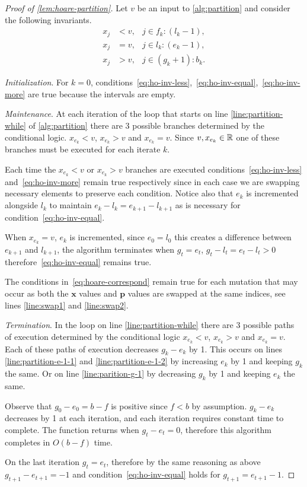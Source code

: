 \documentclass[10pt]{article} %
\begin{document}
\begin{proof}[Proof of \cref{lem:hoare-partition}]
Let $v$ be an input to \cref{alg:partition} and consider the following invariants.
\begin{align}
\label{eq:ho-inv-less}   x_j &< v, & j\in f_k{:}(l_k-1), \\
\label{eq:ho-inv-equal}  x_j &= v, & j \in l_k{:}(e_k-1), \\
\label{eq:ho-inv-more}   x_j &> v, & j \in (g_k+1){:}b_k.
\end{align}
  
\emph{Initialization}. For $k=0$, conditions~\eqref{eq:ho-inv-less},~\eqref{eq:ho-inv-equal},~\eqref{eq:ho-inv-more} are true because the intervals are empty. 
  
\emph{Maintenance}. At each iteration of the loop that starts on line \ref{line:partition-while} of \cref{alg:partition} there are 3 possible branches determined by the conditional logic. $x_{e_k} < v$, $x_{e_k} > v$ and $x_{e_k} = v$. Since $v, x_{e_k} \in \mathbb{R}$ one of these branches must be executed for each iterate $k$.

Each time the $x_{e_k} < v$ or $x_{e_k} > v$ branches are executed conditions~\eqref{eq:ho-inv-less} and~\eqref{eq:ho-inv-more} remain true respectively since in each case we are swapping necessary elements to preserve each condition. Notice also that $e_k$ is incremented alongside $l_k$ to maintain $e_k - l_k = e_{k+1} - l_{k+1}$ as is necessary for condition~\eqref{eq:ho-inv-equal}.

When $x_{e_k} = v$, $e_k$ is incremented, since $e_0 = l_0$ this creates a difference between $e_{k+1}$ and $l_{k+1}$, the algorithm terminates when $g_t = e_t$, $g_t - l_t = e_t - l_t > 0$ therefore~\eqref{eq:ho-inv-equal} remains true.   

The conditions in~\eqref{eq:hoare-correspond} remain true for each mutation that may occur as both the $\bm{x}$ values and $\bm{p}$ values are swapped at the same indices, see lines \ref{line:swap1} and \ref{line:swap2}.
  
\emph{Termination}. In the loop on line \ref{line:partition-while} there are 3 possible paths of execution determined by the conditional logic $x_{e_k} < v$, $x_{e_k} > v$ and $x_{e_k} = v$. Each of these paths of execution decreases $g_k - e_k$ by 1. This occurs on lines \ref{line:partition-e-1-1} and \ref{line:partition-e-1-2} by increasing $e_k$ by 1 and keeping $g_k$ the same. Or on line \ref{line:parition-g-1} by decreasing $g_k$ by 1 and keeping $e_k$ the same.
  
Observe that  $g_0 - e_0 = b - f$ is positive since $f<b$ by assumption. $g_k-e_k$ decreases by 1 at each iteration, and each iteration requires constant time to complete. The function returns when $g_t - e_t = 0$, therefore this algorithm completes in $O(b-f)$ time. 

On the last iteration $g_{t} = e_{t}$, therefore by the same reasoning as above $g_{t+1} - e_{t+1} = -1$ and condition~\eqref{eq:ho-inv-equal} holds for $g_{t+1} = e_{t+1} - 1$.
\end{proof}
\end{document}
